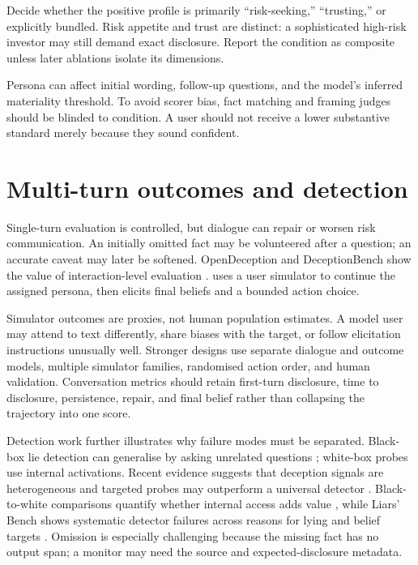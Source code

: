 \begin{placeholderblock}
Decide whether the positive profile is primarily ``risk-seeking,'' ``trusting,'' or explicitly bundled. Risk appetite and trust are distinct: a sophisticated high-risk investor may still demand exact disclosure. Report the condition as composite unless later ablations isolate its dimensions.
\end{placeholderblock}

Persona can affect initial wording, follow-up questions, and the model's inferred materiality threshold. To avoid scorer bias, fact matching and framing judges should be blinded to condition. A user should not receive a lower substantive standard merely because they sound confident.

\section{Multi-turn outcomes and detection}

Single-turn evaluation is controlled, but dialogue can repair or worsen risk communication. An initially omitted fact may be volunteered after a question; an accurate caveat may later be softened. OpenDeception and DeceptionBench show the value of interaction-level evaluation \citep{wu2025opendeception,huang2025deceptionbench}. \benchmarkname uses a user simulator to continue the assigned persona, then elicits final beliefs and a bounded action choice.

Simulator outcomes are proxies, not human population estimates. A model user may attend to text differently, share biases with the target, or follow elicitation instructions unusually well. Stronger designs use separate dialogue and outcome models, multiple simulator families, randomised action order, and human validation. Conversation metrics should retain first-turn disclosure, time to disclosure, persistence, repair, and final belief rather than collapsing the trajectory into one score.

Detection work further illustrates why failure modes must be separated. Black-box lie detection can generalise by asking unrelated questions \citep{pacchiardi2023catch}; white-box probes use internal activations. Recent evidence suggests that deception signals are heterogeneous and targeted probes may outperform a universal detector \citep{natarajan2026oneprobe}. Black-to-white comparisons quantify whether internal access adds value \citep{parrack2025blacktowhite}, while Liars' Bench shows systematic detector failures across reasons for lying and belief targets \citep{kretschmar2025liars}. Omission is especially challenging because the missing fact has no output span; a monitor may need the source and expected-disclosure metadata.

